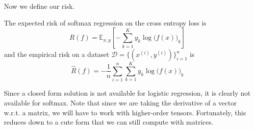   Now we define our risk. 

  \begin{theorem}[Risk]
    The expected risk of softmax regression on the cross entropy loss is 
    \begin{equation}
      R(f) = \mathbb{E}_{x, y} \left[ - \sum_{k=1}^K y_k \log \big( f(x) \big)_k \right]
    \end{equation}
    and the empirical risk on a dataset $\mathcal{D} = \{(x^{(i)}, y^{(i)})\}_{i=1}^n$ is 
    \begin{equation}
      \hat{R}(f) = - \frac{1}{n} \sum_{i=1}^n \sum_{k=1}^K y_k \log \big( f(x) \big)_k
    \end{equation}
  \end{theorem}

  Since a closed form solution is not available for logistic regression, it is clearly not available for softmax. Note that since we are taking the derivative of a vector w.r.t. a matrix, we will have to work with higher-order tensors. Fortunately, this reduces down to a cute form that we can still compute with matrices. 

